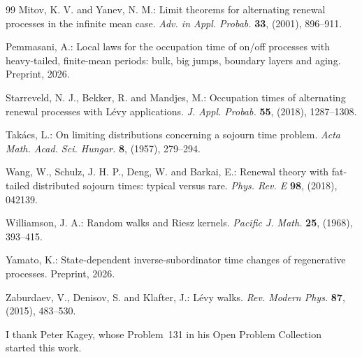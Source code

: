 \documentclass[EJP,preprint]{ejpecp}
\theoremstyle{ejpecpbodyit}
\begin{document}
\begin{thebibliography}{99}
 Mitov, K. V. and Yanev, N. M.: Limit theorems for
  alternating renewal processes in the infinite mean case. \emph{Adv. in Appl.
  Probab.} \textbf{33}, (2001), 896--911. 

 Pemmasani, A.: Local laws for the occupation time of on/off processes with
  heavy-tailed, finite-mean periods: bulk, big jumps, boundary layers and aging. Preprint,
  2026.

 Starreveld, N. J., Bekker, R. and Mandjes, M.: Occupation times
  of alternating renewal processes with L\'evy applications. \emph{J. Appl.
  Probab.} \textbf{55}, (2018), 1287--1308. 

 Tak\'acs, L.: On limiting distributions concerning a
  sojourn time problem. \emph{Acta Math. Acad. Sci. Hungar.} \textbf{8},
  (1957), 279--294.

 Wang, W., Schulz, J. H. P., Deng, W. and Barkai, E.:
  Renewal theory with fat-tailed distributed sojourn times: typical versus
  rare. \emph{Phys. Rev. E} \textbf{98}, (2018), 042139. 

 Williamson, J. A.: Random walks and Riesz kernels.
  \emph{Pacific J. Math.} \textbf{25}, (1968), 393--415. 

 Yamato, K.: State-dependent inverse-subordinator time changes of
  regenerative processes. Preprint, 2026. 

 Zaburdaev, V., Denisov, S. and Klafter, J.: L\'evy walks.
  \emph{Rev. Modern Phys.} \textbf{87}, (2015), 483--530. 

\end{thebibliography}

\begin{acks}[Acknowledgments]
I thank Peter Kagey, whose Problem~131 in his Open Problem
Collection~\cite{kagey131} started this work.
\end{acks}
\end{document}
